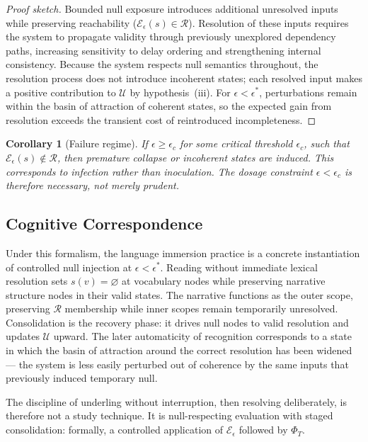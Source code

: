 \documentclass[11pt]{article}
\newtheorem{corollary}{Corollary}
\theoremstyle{remark}
\begin{document}
\begin{proof}[Proof sketch]
Bounded null exposure introduces additional unresolved inputs while preserving reachability ($\mathcal{E}_\epsilon(s) \in \mathcal{R}$). Resolution of these inputs requires the system to propagate validity through previously unexplored dependency paths, increasing sensitivity to delay ordering and strengthening internal consistency. Because the system respects null semantics throughout, the resolution process does not introduce incoherent states; each resolved input makes a positive contribution to $\mathcal{U}$ by hypothesis~(iii). For $\epsilon < \epsilon^*$, perturbations remain within the basin of attraction of coherent states, so the expected gain from resolution exceeds the transient cost of reintroduced incompleteness.
\end{proof}

\begin{corollary}[Failure regime]
If $\epsilon \geq \epsilon_c$ for some critical threshold $\epsilon_c$, such that $\mathcal{E}_\epsilon(s) \notin \mathcal{R}$, then premature collapse or incoherent states are induced. This corresponds to infection rather than inoculation. The dosage constraint $\epsilon < \epsilon_c$ is therefore necessary, not merely prudent.
\end{corollary}

\subsection{Cognitive Correspondence}

Under this formalism, the language immersion practice is a concrete instantiation of controlled null injection at $\epsilon < \epsilon^*$. Reading without immediate lexical resolution sets $s(v) = \varnothing$ at vocabulary nodes while preserving narrative structure nodes in their valid states. The narrative functions as the outer scope, preserving $\mathcal{R}$ membership while inner scopes remain temporarily unresolved. Consolidation is the recovery phase: it drives null nodes to valid resolution and updates $\mathcal{U}$ upward. The later automaticity of recognition corresponds to a state in which the basin of attraction around the correct resolution has been widened — the system is less easily perturbed out of coherence by the same inputs that previously induced temporary null.

The discipline of underling without interruption, then resolving deliberately, is therefore not a study technique. It is null-respecting evaluation with staged consolidation: formally, a controlled application of $\mathcal{E}_\epsilon$ followed by $\Phi_T$.
\end{document}
